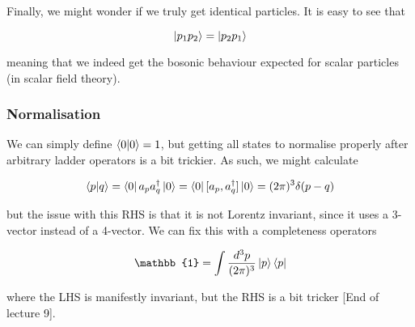\documentclass{article}
\theoremstyle{definition}
\begin{document}
Finally, we might wonder if we truly get identical particles. It is easy to see
that

$$ \ket{p_1 p_2} = \ket{p_2 p_1} $$

meaning that we indeed get the bosonic behaviour expected for scalar particles
(in scalar field theory).

\subsubsection{Normalisation}

We can simply define $\bra{0} \ket{0} = 1$, but getting all states to normalise
properly after arbitrary ladder operators is a bit trickier. As such, we might
calculate

$$ \bra{p} \ket{q} = \bra{0} a_p a_q^\dagger \ket{0} = \bra{0} [a_p,
a_q^\dagger] \ket{0} = (2\pi)^3 \delta(p - q) $$

but the issue with this RHS is that it is not Lorentz invariant, since it uses a
3-vector instead of a 4-vector. We can fix this with a completeness operators

$$ \mathbb{1} = \int \frac{d^3p}{(2\pi)^3} \ket{p} \bra{p} $$

where the LHS is manifestly invariant, but the RHS is a bit tricker [End of
lecture 9].
\end{document}
